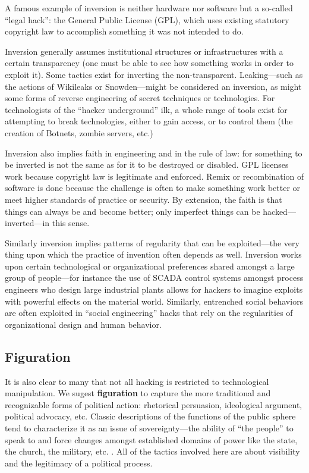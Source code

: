 \documentclass[10pt,letter,oneside]{scrartcl}
\begin{document}
A famous example of inversion is neither hardware nor software but a so-called
``legal hack'': the General Public License (GPL), which uses existing statutory
copyright law to accomplish something it was not intended to do.

Inversion generally assumes institutional structures or infrastructures with a
certain transparency (one must be able to see how something works in order to
exploit it).  Some tactics exist for inverting the
non-transparent. Leaking---such as the actions of Wikileaks or Snowden---might
be considered an inversion, as might some forms of reverse engineering of secret
techniques or technologies.  For technologists of the ``hacker underground''
ilk, a whole range of tools exist for attempting to break technologies, either
to gain access, or to control them (the creation of Botnets, zombie servers,
etc.)

Inversion also implies faith in engineering and in the rule of law: for
something to be inverted is not the same as for it to be destroyed or disabled.
GPL licenses work because copyright law is legitimate and enforced.  Remix or
recombination of software is done because the challenge is often to make
something work better or meet higher standards of practice or security.  By
extension, the faith is that things can always be and become better; only
imperfect things can be hacked--- inverted---in this sense.

Similarly inversion implies patterns of regularity that can be exploited---the
very thing upon which the practice of invention often depends as well.
Inversion works upon certain technological or organizational preferences shared
amongst a large group of people---for instance the use of SCADA control systems
amongst process engineers who design large industrial plants allows for hackers
to imagine exploits with powerful effects on the material world.  Similarly,
entrenched social behaviors are often exploited in ``social engineering'' hacks
that rely on the regularities of organizational design and human behavior.

\subsection*{Figuration}

It is also clear to many that not all hacking is restricted to technological
manipulation. We sugest \textbf{figuration} to capture the more traditional and
recognizable forms of political action: rhetorical persuasion, ideological
argument, political advocacy, etc.  Classic descriptions of the functions of the
public sphere tend to characterize it as an issue of sovereignty---the ability
of ``the people'' to speak to and force changes amongst established domains of
power like the state, the church, the military,
etc. \autocite{anderson2006imagined}.  All of the tactics involved here are about
visibility and the legitimacy of a political process.
\end{document}
